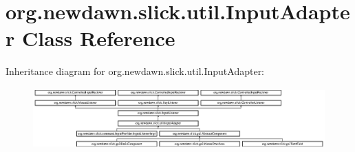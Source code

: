 \hypertarget{classorg_1_1newdawn_1_1slick_1_1util_1_1_input_adapter}{}\section{org.\+newdawn.\+slick.\+util.\+Input\+Adapter Class Reference}
\label{classorg_1_1newdawn_1_1slick_1_1util_1_1_input_adapter}
Inheritance diagram for org.\+newdawn.\+slick.\+util.\+Input\+Adapter\+:\begin{figure}[H]
\begin{center}
\leavevmode
\includegraphics[height=2.333333cm]{classorg_1_1newdawn_1_1slick_1_1util_1_1_input_adapter}
\end{center}
\end{figure}
